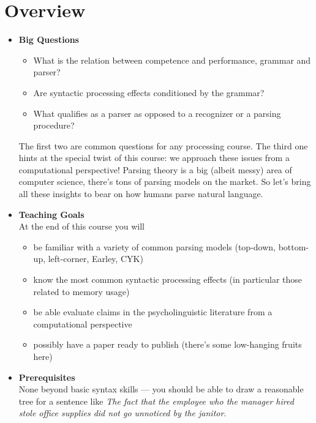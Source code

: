 \section{Overview}
\begin{itemize}
    \item \textbf{Big Questions}
        \begin{itemize}
            \item What is the relation between competence and performance, grammar and parser?
            \item Are syntactic processing effects conditioned by the grammar?
            \item What qualifies as a parser as opposed to a recognizer or a parsing procedure?
        \end{itemize}
        The first two are common questions for any processing course.
        The third one hints at the special twist of this course: we approach these issues from a computational perspective!
        Parsing theory is a big (albeit messy) area of computer science, there's tons of parsing models on the market.
        So let's bring all these insights to bear on how humans parse natural language.

    \item \textbf{Teaching Goals}\\
        At the end of this course you will 
        \begin{itemize}
            \item be familiar with a variety of common parsing models (top-down, bottom-up, left-corner, Earley, CYK)
            \item know the most common syntactic processing effects (in particular those related to memory usage)
            \item be able evaluate claims in the psycholinguistic literature from a computational perspective
            \item possibly have a paper ready to publish (there's some low-hanging fruits here)
        \end{itemize}

    \item \textbf{Prerequisites}\\
    None beyond basic syntax skills --- you should be able to draw a reasonable tree for a sentence like \emph{The fact that the employee who the manager hired stole office supplies did not go unnoticed by the janitor}.
\end{itemize}

